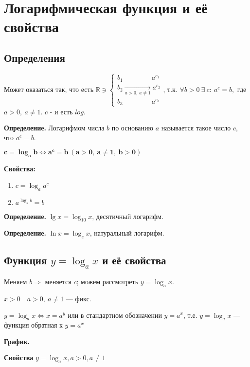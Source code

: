 \documentclass{article}
\begin{document}
    \section{Логарифмическая функция и её свойства}

    \subsection{Определения}

    Может оказаться так, что есть \( \mathbb{R} \ni \begin{cases} b_1\qquad\qquad\  a^{c_1}\\ b_2 \xrightarrow[a > 0,\ a \neq 1]{} a^{c_2}\\ b_3\qquad\qquad\  a^{c_3} \end{cases} \), т.к. \( \forall b > 0\ \exists\ c:\ a^c = b, \) где \( a > 0,\ a \neq 1 \). \( c \) - и есть \(log\).
    
    \textbf{Определение.} Логарифмом числа \(b\) по основанию \(a\) называется такое число \(c\), что \(a^c = b\).

    \(\mathbf{c = \log_a b \Leftrightarrow a^c = b\ (a > 0,\ a \neq 1,\ b > 0)}\)

    \textbf{Свойства:}
    \begin{enumerate}
        \item \(c = \log_a a^c\)
        \item \(a^{\log_a b} = b\)
    \end{enumerate}

    \textbf{Определение.} \(\lg x = \log_{10} x\), десятичный логарифм.
    
    \textbf{Определение.} \(\ln x = \log_e x\), натуральный логарифм.
    
    \subsection{Функция \(y = \log_a x\) и её свойства}
    
    Меняем \( b \Rightarrow \) меняется \(c\); можем рассмотреть \( y = \log_a x \). 

    \(x > 0\quad a > 0,\ a \neq 1\) --- фикс.

    \(y = \log_a x \Leftrightarrow x = a^y \) или в стандартном обозначении \(y = a^x\), т.е. \( y = \log_a x \) --- функция обратная к \( y = a^x \)
    
    \textbf{График.} %

    \textbf{Свойства} \(y = \log_a x, a > 0, a \neq 1\)
\end{document}
